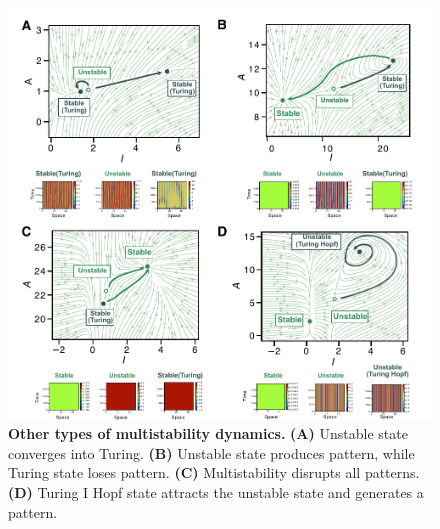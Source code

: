 \documentclass[10pt,letterpaper]{article}
\begin{document}
\begin{figure}[H]
    \includegraphics[width=1\textwidth]{figures/multistability_leftovers}
    \vspace{5pt}

    \caption{{\bf Other types of multistability dynamics.} \textbf{(A)} Unstable state converges into Turing. \textbf{(B)} Unstable state produces pattern, while Turing state loses pattern. \textbf{(C)} Multistability disrupts all patterns. \textbf{(D)} Turing I Hopf state attracts the unstable state and generates a pattern.}

    \label{sup_fig4}
\end{figure}
\end{document}
